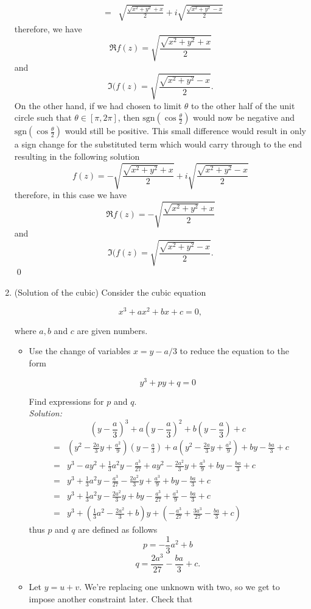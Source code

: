 \documentclass[10pt]{amsart}
\theoremstyle{nonumberplain}
\begin{document}
\begin{enumerate}[label={\bf {\arabic*}:}]
\begin{eqnarray*}
      &=& \sqrt{ \frac{ \sqrt{x^2 + y^2} + x }{ 2 }} +i \sqrt{ \frac{ \sqrt{x^2 + y^2} - x }{ 2 }}
\end{eqnarray*}
therefore, we have $$\Re{f(z)} = \sqrt{ \frac{ \sqrt{x^2 + y^2} + x }{ 2 }}$$ and $$\Im{(f(z)} = \sqrt{ \frac{ \sqrt{x^2 + y^2} - x }{ 2 }}.$$
On the other hand, if we had chosen to limit $\theta$ to the other half of the unit circle such that $\theta \in [\pi, 2\pi]$, then $\text{sgn} \left(\cos \frac{\theta}{2}\right)$ would now be negative and $\text{sgn} \left(\cos \frac{\theta}{2}\right)$ would still be positive.
This small difference would result in only a sign change for the substituted term which would carry through to the end resulting in the following solution
$$f(z) = -\sqrt{ \frac{ \sqrt{x^2 + y^2} + x }{ 2 }} +i \sqrt{ \frac{ \sqrt{x^2 + y^2} - x }{ 2 }}$$
therefore, in this case we have $$\Re{f(z)} = -\sqrt{ \frac{ \sqrt{x^2 + y^2} + x }{ 2 }}$$ and $$\Im{(f(z)} = \sqrt{ \frac{ \sqrt{x^2 + y^2} - x }{ 2 }}.$$
\qed


\item (Solution of the cubic) Consider the cubic equation

$$
x^3+a x^2+b x+c=0,
$$

where $a, b$ and $c$ are given numbers.
\begin{itemize}
\item Use the change of variables $x=y-a / 3$ to reduce the equation to the form

$$
y^3+p y+q=0
$$

Find expressions for $p$ and $q$. \\
\textit{Solution:} \\
$$\left(y - \frac{a}{3}\right)^3 + a\left(y - \frac{a}{3}\right)^2 + b\left(y - \frac{a}{3}\right) + c $$
\begin{eqnarray*}
&=& \left(y^2 - \frac{2a}{3}y + \frac{a^2}{9}\right)\left(y - \frac{a}{3}\right) + a\left(y^2 - \frac{2a}{3}y + \frac{a^2}{9}\right) + by - \frac{ba}{3} + c \\
&=& y^3 - ay^2 + \frac{1}{3}a^2 y - \frac{a^3}{27} + ay^2 - \frac{2a^2}{3}y + \frac{a^3}{9} + by - \frac{ba}{3} + c \\
&=& y^3 + \frac{1}{3}a^2 y - \frac{a^3}{27} - \frac{2a^2}{3}y + \frac{a^3}{9} + by - \frac{ba}{3} + c \\
&=& y^3 + \frac{1}{3}a^2 y  - \frac{2a^2}{3}y + by - \frac{a^3}{27} + \frac{a^3}{9} - \frac{ba}{3} + c \\
&=& y^3 + \left(\frac{1}{3}a^2  - \frac{2a^2}{3} + b\right)y + \left( - \frac{a^3}{27} + \frac{3a^3}{27} - \frac{ba}{3} + c\right)
\end{eqnarray*}
thus $p$ and $q$ are defined as follows $$p = -\frac{1}{3}a^2 + b$$ $$q = \frac{2a^3}{27} - \frac{ba}{3} + c.$$
\item Let $y=u+v$. We're replacing one unknown with two, so we get to impose another constraint later. Check that


\end{itemize}
\end{enumerate}
\end{document}
